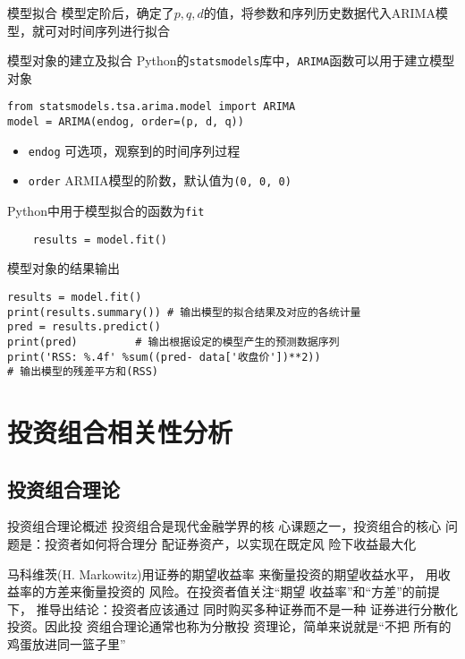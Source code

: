 \documentclass[t]{beamer}
\begin{document}
\begin{frame}[fragile]{模型拟合}
模型定阶后，确定了$p,q,d$的值，将参数和序列历史数据代入ARIMA模型，就可对时间序列进行拟合

\begin{center}
\end{center}
\end{frame}


\begin{frame}[fragile]{模型对象的建立及拟合}
Python的\verb|statsmodels|库中，\verb|ARIMA|函数可以用于建立模型对象
\begin{lstlisting}
from statsmodels.tsa.arima.model import ARIMA
model = ARIMA(endog, order=(p, d, q))
\end{lstlisting}
\begin{itemize}
    \item \verb|endog| 可选项，观察到的时间序列过程
    \item \verb|order| ARMIA模型的阶数，默认值为\verb|(0, 0, 0)|
\end{itemize}

Python中用于模型拟合的函数为\verb|fit|
\begin{lstlisting}
    results = model.fit()
\end{lstlisting}
\end{frame}


\begin{frame}[fragile]{模型对象的结果输出}
\begin{lstlisting}
results = model.fit()
print(results.summary()) # 输出模型的拟合结果及对应的各统计量
pred = results.predict()
print(pred)         # 输出根据设定的模型产生的预测数据序列
print('RSS: %.4f' %sum((pred- data['收盘价'])**2))  
# 输出模型的残差平方和(RSS)
\end{lstlisting}
\end{frame}


\section{投资组合相关性分析}
\subsection{投资组合理论}
\begin{frame}[fragile]{投资组合理论概述}
 投资组合是现代金融学界的核
心课题之一，投资组合的核心
问题是：投资者如何将合理分
配证券资产，以实现在既定风
险下收益最大化

马科维茨(H. Markowitz)用证券的期望收益率
来衡量投资的期望收益水平，
用收益率的方差来衡量投资的
风险。在投资者值关注“期望
收益率”和“方差”的前提下，
推导出结论：投资者应该通过
同时购买多种证券而不是一种
证券进行分散化投资。因此投
资组合理论通常也称为分散投
资理论，简单来说就是“不把
所有的鸡蛋放进同一篮子里”
\end{frame}
\end{document}
